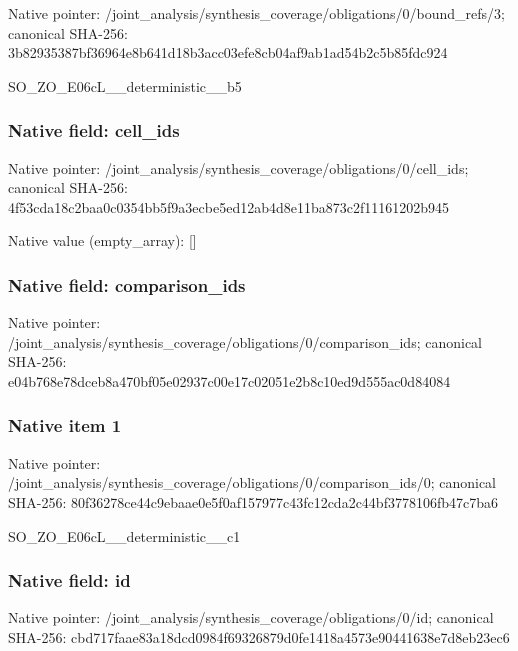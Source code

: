 \documentclass[10pt,a4paper]{article}
\begin{document}
Native pointer: /joint\_analysis/synthesi\allowbreak{}s\_coverage/obligations/0\allowbreak{}/bound\_refs/3; canonical SHA-256: 3b82935387bf36964e8b641d\allowbreak{}18b3acc03efe8cb04af9ab1a\allowbreak{}d54b2c5b85fdc924


SO\_ZO\_E06cL\_\_deterministic\_\_b5


\subsubsection{Native field: cell\_ids}


Native pointer: /joint\_analysis/synthesi\allowbreak{}s\_coverage/obligations/0\allowbreak{}/cell\_ids; canonical SHA-256: 4f53cda18c2baa0c0354bb5f\allowbreak{}9a3ecbe5ed12ab4d8e11ba87\allowbreak{}3c2f11161202b945



Native value (empty\_array): []



\subsubsection{Native field: comparison\_ids}


Native pointer: /joint\_analysis/synthesi\allowbreak{}s\_coverage/obligations/0\allowbreak{}/comparison\_ids; canonical SHA-256: e04b768e78dceb8a470bf05e\allowbreak{}02937c00e17c02051e2b8c10\allowbreak{}ed9d555ac0d84084



\subsubsection{Native item 1}


Native pointer: /joint\_analysis/synthesi\allowbreak{}s\_coverage/obligations/0\allowbreak{}/comparison\_ids/0; canonical SHA-256: 80f36278ce44c9ebaae0e5f0\allowbreak{}af157977c43fc12cda2c44bf\allowbreak{}3778106fb47c7ba6


SO\_ZO\_E06cL\_\_deterministic\_\_c1


\subsubsection{Native field: id}


Native pointer: /joint\_analysis/synthesi\allowbreak{}s\_coverage/obligations/0\allowbreak{}/id; canonical SHA-256: cbd717faae83a18dcd0984f6\allowbreak{}9326879d0fe1418a4573e904\allowbreak{}41638e7d8eb23ec6
\end{document}
